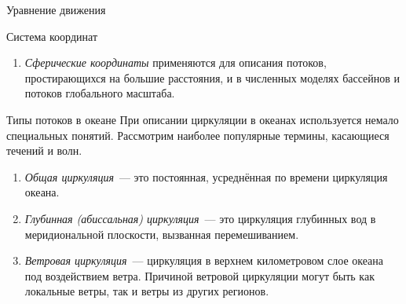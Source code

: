 \begin{chapter}{Уравнение движения}
\begin{section}{Система координат}
\begin{enumerate}
\emph{$\beta$-плоскость}~--- прямоугольная система координат, в которой сила
Кориолиса полагается линейно зависимой от широты. Она используется
для описания потоков в масштабах океанических бассейнов.
%

\item
\emph{Сферические координаты} применяются для описания потоков, простирающихся 
на большие расстояния, и в численных моделях бассейнов и потоков глобального 
масштаба.
%
\end{enumerate}
\end{section}

\begin{section}{Типы потоков в океане}
При описании циркуляции в океанах используется немало специальных понятий.
Рассмотрим наиболее популярные термины, касающиеся течений и волн.
%

\begin{enumerate}
\item
\emph{Общая циркуляция}~--- это постоянная, усреднённая по времени
циркуляция океана.
%

\item
\emph{Глубинная (абиссальная) циркуляция}~--- это циркуляция глубинных вод
в меридиональной плоскости, вызванная перемешиванием.
%

\item
\emph{Ветровая циркуляция}~--- циркуляция в верхнем километровом
слое океана под воздействием ветра. Причиной ветровой циркуляции могут быть 
как локальные ветры, так и ветры из других регионов.
%


\end{enumerate}
\end{section}
\end{chapter}
